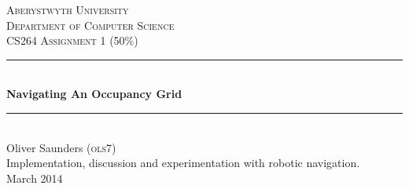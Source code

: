 \begin{titlepage}

\newcommand{\HRule}{\rule{\linewidth}{0.5mm}} %

\center %
 

\textsc{\LARGE Aberystwyth University}\\[1.5cm] %
\textsc{\Large Department of Computer Science}\\[0.5cm] %
\textsc{\large CS264 Assignment 1 (50\%)}{}\\[0.5cm] %


\HRule \\[0.4cm]
{ \huge \bfseries Navigating An Occupancy Grid}\\[0.4cm] %
\HRule \\[1.5cm]
 
{\large Oliver Saunders (\textsc{ols7})}\\[1cm] %

Implementation, discussion and experimentation with robotic navigation.\\[1cm]

{\large March 2014}\\[1cm] %

\vfill %

\end{titlepage}


